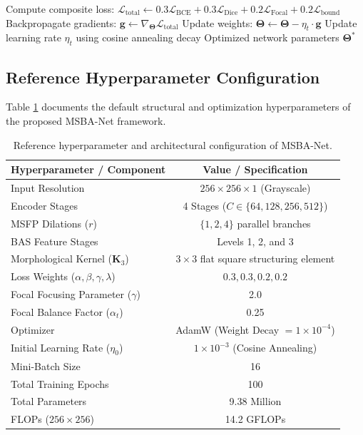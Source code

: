 \documentclass{ieeeaccess}
\begin{document}
\begin{algorithm}[!t]
\begin{algorithmic}[1]
    \STATE Compute composite loss:
    \STATE \quad $\mathcal{L}_{\text{total}} \leftarrow 0.3\mathcal{L}_{\text{BCE}} + 0.3\mathcal{L}_{\text{Dice}} + 0.2\mathcal{L}_{\text{Focal}} + 0.2\mathcal{L}_{\text{bound}}$
    \STATE Backpropagate gradients: $\mathbf{g} \leftarrow \nabla_{\boldsymbol{\Theta}} \mathcal{L}_{\text{total}}$
    \STATE Update weights: $\boldsymbol{\Theta} \leftarrow \boldsymbol{\Theta} - \eta_t \cdot \mathbf{g}$
  \ENDFOR
  \STATE Update learning rate $\eta_t$ using cosine annealing decay
\ENDFOR
\RETURN Optimized network parameters $\boldsymbol{\Theta}^*$
\end{algorithmic}
\end{algorithm}

\subsection{Reference Hyperparameter Configuration}
Table \ref{tab:hyperparameters} documents the default structural and optimization hyperparameters of the proposed MSBA-Net framework.

\begin{table}[!t]
\centering
\fontsize{8pt}{10pt}\selectfont
\caption{Reference hyperparameter and architectural configuration of MSBA-Net.}
\label{tab:hyperparameters}
\begin{tabular}{|l|c|}
\hline
\textbf{Hyperparameter / Component} & \textbf{Value / Specification} \\
\hline
Input Resolution & $256 \times 256 \times 1$ (Grayscale) \\
Encoder Stages & 4 Stages ($C \in \{64, 128, 256, 512\}$) \\
MSFP Dilations ($r$) & $\{1, 2, 4\}$ parallel branches \\
BAS Feature Stages & Levels 1, 2, and 3 \\
Morphological Kernel ($\mathbf{K}_3$) & $3 \times 3$ flat square structuring element \\
Loss Weights ($\alpha, \beta, \gamma, \lambda$) & $0.3, 0.3, 0.2, 0.2$ \\
Focal Focusing Parameter ($\gamma$) & 2.0 \\
Focal Balance Factor ($\alpha_t$) & 0.25 \\
Optimizer & AdamW (Weight Decay $= 1 \times 10^{-4}$) \\
Initial Learning Rate ($\eta_0$) & $1 \times 10^{-3}$ (Cosine Annealing) \\
Mini-Batch Size & 16 \\
Total Training Epochs & 100 \\
Total Parameters & 9.38 Million \\
FLOPs ($256 \times 256$) & 14.2 GFLOPs \\
\hline
\end{tabular}
\end{table}
\end{document}
